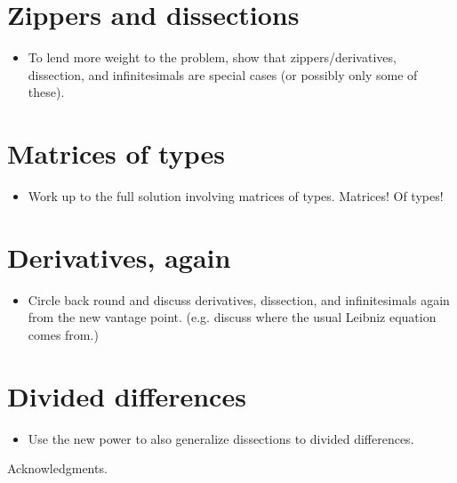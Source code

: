 \documentclass[authoryear,preprint]{sigplanconf}
\begin{document}
\section{Zippers and dissections}
\label{sec:zippers-and-dissections}


\begin{itemize}
\item To lend more weight to the problem, show that
  zippers/derivatives, dissection, and infinitesimals are special
  cases (or possibly only some of these).
\end{itemize}

\section{Matrices of types}
\label{sec:matrices-of-types}

\begin{itemize}
\item Work up to the full solution involving matrices of types.
  Matrices!  Of types!
\end{itemize}

\section{Derivatives, again}
\label{sec:derivatives-again}

\begin{itemize}
\item Circle back round and discuss derivatives, dissection, and
  infinitesimals again from the new vantage point.  (e.g. discuss
  where the usual Leibniz equation comes from.)
\end{itemize}

\section{Divided differences}
\label{sec:divided-differences}

\begin{itemize}
\item Use the new power to also generalize dissections to divided
  differences.
\end{itemize}

\acks

Acknowledgments.



\end{document}
